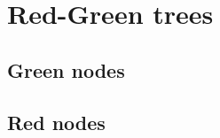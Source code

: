 \section{Red-Green trees}
\label{sec:red-green-trees}


\subsection{Green nodes}
\label{sec:green-nodes}

\subsection{Red nodes}
\label{sec:red-nodes}
